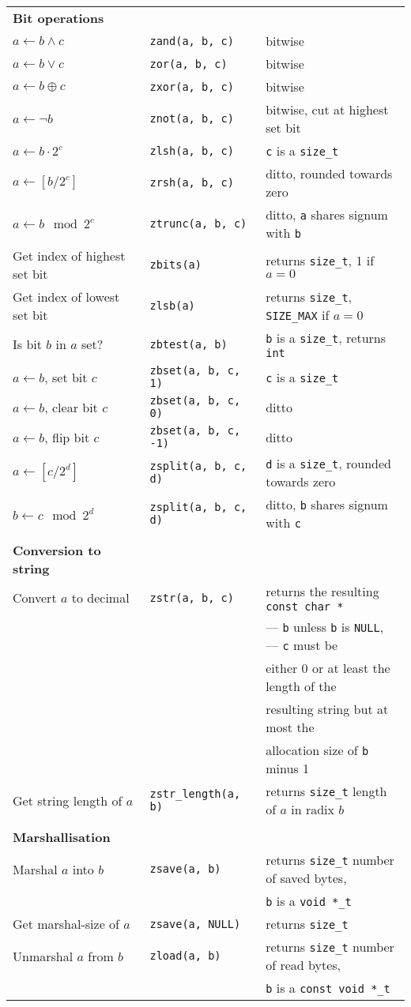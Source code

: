 \documentclass[10pt,draft]{article}
\newcommand{\size}{{\tt size\_t}}
\newcommand{\ullong}{{\tt unsigned long long int}}
\newcommand{\entry}[3]{ #2 & {\tt #1} & #3 \\ }
\newcommand{\entrycont}[1]{ & & \hspace*{2ex} #1 \\ }
\newcommand{\entryTwo}[4]{\entry{#1}{#2}{#3}\entrycont{#4}}
\newcommand{\entryThree}[5]{\entryTwo{#1}{#2}{#3}{#4}\entrycont{#5}}
\newcommand{\entryFour}[6]{\entryThree{#1}{#2}{#3}{#4}{#5}\entrycont{#6}}
\newcommand{\entryFive}[7]{\entryFour{#1}{#2}{#3}{#4}{#5}{#6}\entrycont{#7}}
\begin{document}
\begin{tabular}{lll}



\textbf{Bit operations} \\
\entry{zand(a, b, c)}      {$a \gets b \wedge c$}         {bitwise}
\entry{zor(a, b, c)}       {$a \gets b \vee c$}           {bitwise}
\entry{zxor(a, b, c)}      {$a \gets b \oplus c$}         {bitwise}
\entry{znot(a, b, c)}      {$a \gets \lnot b$}            {bitwise, cut at highest set bit}
\entry{zlsh(a, b, c)}      {$a \gets b \cdot 2^c$}        {{\tt c} is a \size{}}
\entry{zrsh(a, b, c)}      {$a \gets [b / 2^c]$}          {ditto, rounded towards zero}
\entry{ztrunc(a, b, c)}    {$a \gets b \mod 2^c$}         {ditto, {\tt a} shares signum with {\tt b}}
\entry{zbits(a)}           {Get index of highest set bit} {returns \size{}, 1 if $a = 0$}
\entry{zlsb(a)}            {Get index of lowest set bit}  {returns \size{}, {\tt SIZE\_MAX} if $a = 0$}
\entry{zbtest(a, b)}       {Is bit $b$ in $a$ set?}       {{\tt b} is a \size{}, returns {\tt int}}
\entry{zbset(a, b, c, 1)}  {$a \gets b$, set bit $c$}     {{\tt c} is a \size{}}
\entry{zbset(a, b, c, 0)}  {$a \gets b$, clear bit $c$}   {ditto}
\entry{zbset(a, b, c, -1)} {$a \gets b$, flip bit $c$}    {ditto}
\entry{zsplit(a, b, c, d)} {$a \gets [c / 2^d]$}          {{\tt d} is a \size{}, rounded towards zero}
\entry{zsplit(a, b, c, d)} {$b \gets c \mod 2^d$}         {ditto, {\tt b} shares signum with {\tt c}}
\\

\textbf{Conversion to string} \\
\entryFive{zstr(a, b, c)}           {Convert $a$ to decimal}   {returns the resulting {\tt const char *}}
                                                               {--- {\tt b} unless {\tt b} is
                                                                    {\tt NULL}, --- {\tt c} must be}
                                                               {either 0 or at least the length of the}
                                                               {resulting string but at most the}
                                                               {allocation size of {\tt b} minus 1}
\entry    {zstr\_length(a, b)}      {Get string length of $a$} {returns \size{} length of $a$ in radix $b$}
\\

\textbf{Marshallisation} \\
\entryTwo{zsave(a, b)}    {Marshal $a$ into $b$}    {returns \size{} number of saved bytes,}
                                                    {{\tt b} is a {\tt void *\_t}}
\entry   {zsave(a, NULL)} {Get marshal-size of $a$} {returns \size{}}
\entryTwo{zload(a, b)}    {Unmarshal $a$ from $b$}  {returns \size{} number of read bytes,}
                                                    {{\tt b} is a {\tt const void *\_t}}


\end{tabular}
\end{document}
